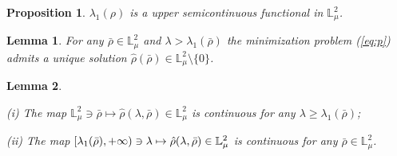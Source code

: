 \documentclass[10pt,a4paper]{amsart}
\newtheorem{proposition}{Proposition}
\newtheorem{lemma}{Lemma}
\begin{document}
\begin{proposition}
\label{prop2} $\lambda_1(\rho)$ is a upper semicontinuous functional in $%
\mathbb{L}_{\mu}^{2}$.
\end{proposition}

\begin{lemma}
\label{lem1} For any $\bar{\rho}\in \mathbb{L}_{\mu }^{2}$ and $\lambda
>\lambda _{1}(\bar{\rho})$ the minimization problem (\ref{eq:p}) admits a
unique solution $\hat{\rho}(\bar{\rho})\in \mathbb{L}_{\mu }^{2}\setminus
\{0\}$.
\end{lemma}

\begin{lemma}
\label{lem51}

(i) The map $\mathbb{L}^{2}_{\mu} \ni \bar{\rho} \mapsto \hat{\rho}(\lambda,%
\bar{\rho}) \in \mathbb{L}^{2}_{\mu}$ is continuous for any $\lambda \geq
\lambda_1(\bar{\rho})$;

(ii) The map $[\lambda _{1}(\bar{\rho}),+\infty )\ni \lambda \mapsto \hat{%
\rho}(\lambda ,\bar{\rho})\in \mathbb{L}_{\mu }^{2}$ is continuous for any $%
\bar{\rho}\in \mathbb{L}_{\mu }^{2}$.
\end{lemma}
\end{document}
